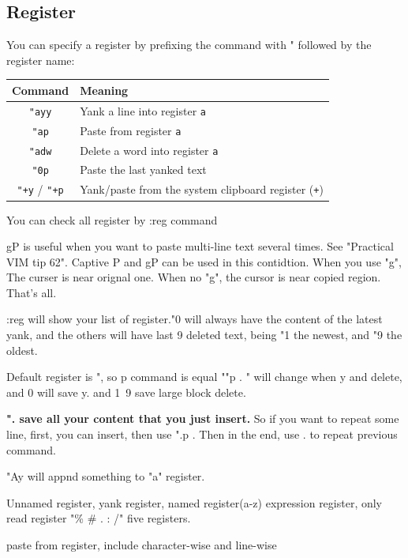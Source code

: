 \documentclass[paper=8.5in:11in, twoside, 12pt, pagesize=pdftex]{book}
\begin{document}
\subsection{Register}
	You can specify a register by prefixing the command with " followed by the register name:
\begin{center}
\begin{tabular}{|c|l|}
	\hline
	\textbf{Command} & \textbf{Meaning} \\
	\hline
	\verb|"ayy| & Yank a line into register \verb|a| \\
	\verb|"ap|  & Paste from register \verb|a| \\
	\verb|"adw| & Delete a word into register \verb|a| \\
	\verb|"0p|  & Paste the last yanked text \\
	\verb|"+y| / \verb|"+p| & Yank/paste from the system clipboard register (\verb|+|) \\
	\hline
\end{tabular}
\end{center}
	
	You can check all register by :reg command 
		
	gP is useful when you want to paste multi-line text several times. See "Practical VIM tip 62". Captive P and gP can be used in this contidtion. When you use "g", The curser is near orignal one. When no "g", the cursor is near copied region. That's all.
		
	:reg will show your list of register."0 will always have the content of the latest yank, and the others will have last 9 deleted text, being "1 the newest, and "9 the oldest.
		
	Default register is ", so p command is equal ""p . " will change when y and delete, and 0 will save y. and 1~9 save large block delete. 
		
	
	\textbf{". save all your content that you just insert.} So if you want to repeat some line, first, you can insert, then use ".p . Then in the end, use . to repeat previous command. 
		
		
	"Ay will appnd something to "a" register.
		
	Unnamed register, yank register,  named register(a-z) expression register, only read register "\% \# . : /" five registers. 
		
	paste from register,  include character-wise and line-wise 
		
\end{document}
